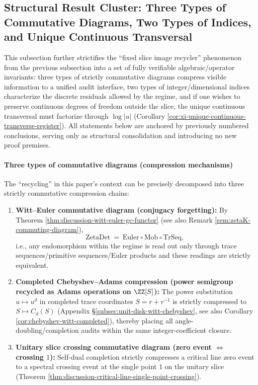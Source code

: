 \subsection{Structural Result Cluster: Three Types of Commutative Diagrams, Two Types of Indices, and Unique Continuous Transversal}\label{subsec:discussion-gc-three-diagrams-two-indices-unique-transversal}
This subsection further strictifies the ``fixed slice image recycler'' phenomenon from the previous subsection into a set of fully verifiable algebraic/operator invariants:
three types of strictly commutative diagrams compress visible information to a unified audit interface, two types of integer/dimensional indices characterize the discrete residuals allowed by the regime, and if one wishes to preserve continuous degrees of freedom outside the slice, the unique continuous transversal must factorize through \(\log|u|\) (Corollary \ref{cor:xi-unique-continuous-transverse-register}).
All statements below are anchored by previously numbered conclusions, serving only as structural consolidation and introducing no new proof premises.

\paragraph{Three types of commutative diagrams (compression mechanisms)}
The ``recycling'' in this paper's context can be precisely decomposed into three strictly commutative compression chains:
\begin{enumerate}
  \item \textbf{Witt--Euler commutative diagram (conjugacy forgetting):}
  By Theorem \ref{thm:discussion-witt-euler-gc-functor} (see also Remark \ref{rem:zetaK-commuting-diagram}),
  \[
  \mathrm{ZetaDet}
  ~=~
  \mathrm{Euler}\circ\mathrm{Mob}\circ\mathrm{TrSeq},
  \]
  i.e., any endomorphism within the regime is read out only through trace sequences/primitive sequences/Euler products and these readings are strictly equivalent.
  \item \textbf{Completed Chebyshev--Adams compression (power semigroup recycled as Adams operations on \(\ZZ[S]\)):}
  The power substitution \(u\mapsto u^d\) in completed trace coordinates \(S=r+r^{-1}\) is strictly compressed to \(S\mapsto C_d(S)\) (Appendix \S\ref{subsec:unit-disk-witt-chebyshev}, see also Corollary \ref{cor:chebyshev-witt-completed}), thereby placing all angle-doubling/completion audits within the same integer-coefficient closure.
  \item \textbf{Unitary slice crossing commutative diagram (zero event \(\Leftrightarrow\) crossing \(1\)):}
  Self-dual completion strictly compresses a critical line zero event to a spectral crossing event at the single point \(1\) on the unitary slice (Theorem \ref{thm:discussion-critical-line-single-point-crossing}).
\end{enumerate}

